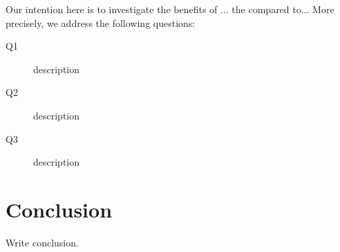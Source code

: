 \documentclass[11pt, DIV=12]{scrartcl}
\theoremstyle{definition}
\begin{document}
Our intention here is to investigate the benefits of ... the compared to...
More precisely, we address the following questions:\\
\begin{description}
	\item[Q1] description
	\item[Q2] description
	\item[Q3] description
\end{description}

\section{Conclusion}
Write conclusion.			

 

	
\end{document}
